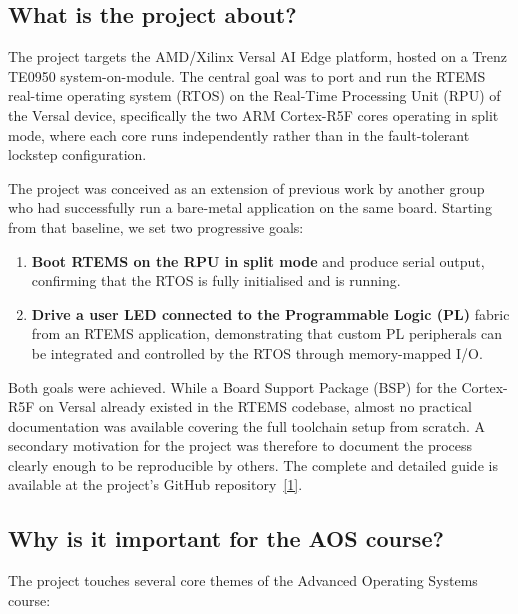 \documentclass[10pt,a4]{article}
\begin{document}

\subsection*{What is the project about?}

The project targets the AMD/Xilinx Versal AI Edge platform, hosted on a Trenz
TE0950 system-on-module.
The central goal was to port and run the RTEMS real-time operating system
(RTOS) on the Real-Time Processing Unit (RPU) of the Versal device, specifically
the two ARM Cortex-R5F cores operating in split mode, where each core runs
independently rather than in the fault-tolerant lockstep configuration.

The project was conceived as an extension of previous work by another group
who had successfully run a bare-metal application on the same board.
Starting from that baseline, we set two progressive goals:

\begin{enumerate}
  \item \textbf{Boot RTEMS on the RPU in split mode} and produce serial output,
        confirming that the RTOS is fully initialised and is
        running.
  \item \textbf{Drive a user LED connected to the Programmable Logic (PL)}
        fabric from an RTEMS application, demonstrating that custom PL
        peripherals can be integrated and controlled by the RTOS through
        memory-mapped I/O.
\end{enumerate}

Both goals were achieved.
While a Board Support Package (BSP) for the Cortex-R5F on Versal already
existed in the RTEMS codebase, almost no practical documentation was available
covering the full toolchain setup from scratch.
A secondary motivation for the project was therefore to document the process
clearly enough to be reproducible by others.
The complete and detailed guide is available at the project's GitHub repository~\hyperlink{github}{[1]}.

\subsection*{Why is it important for the AOS course?}

The project touches several core themes of the Advanced Operating Systems
course:
\end{document}
